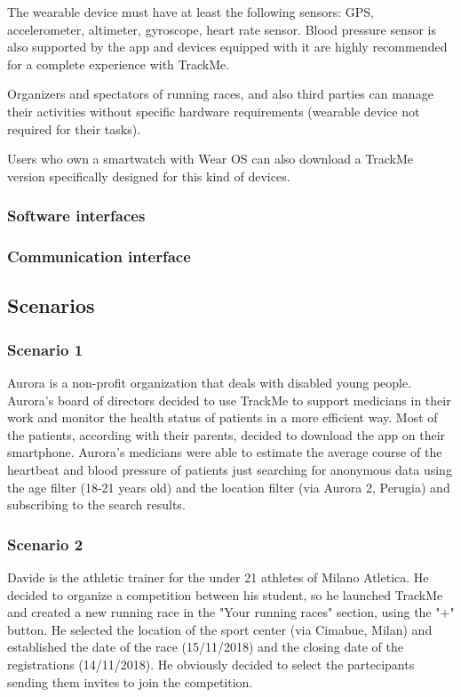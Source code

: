 The wearable device must have at least the following sensors: GPS, accelerometer, altimeter, gyroscope, heart rate sensor. Blood pressure sensor is also supported by the app and devices equipped with it are highly recommended for a complete experience with TrackMe.

Organizers and spectators of running races, and also third parties can manage their activities without specific hardware requirements (wearable device not required for their tasks).

Users who own a smartwatch with Wear OS can also download a TrackMe version specifically designed for this kind of devices.

\subsubsection{Software interfaces}
\subsubsection{Communication interface}

\subsection{Scenarios}
\subsubsection{Scenario 1}
Aurora is a non-profit organization that deals with disabled young people. Aurora's board of directors decided to use TrackMe to support medicians in their work and monitor the health status of patients in a more efficient way. Most of the patients, according with their parents, decided to download the app on their smartphone. Aurora's medicians were able to estimate the average course of the heartbeat and blood pressure of patients just searching for anonymous data using the age filter (18-21 years old) and the location filter (via Aurora 2, Perugia) and subscribing to the search results.

\subsubsection{Scenario 2}
Davide is the athletic trainer for the under 21 athletes of Milano Atletica. He decided to organize a competition between his student, so he launched TrackMe and created a new running race in the "Your running races" section, using the "+" button. He selected the location of the sport center (via Cimabue, Milan) and established the date of the race (15/11/2018) and the closing date of the registrations (14/11/2018). He obviously decided to select the partecipants sending them invites to join the competition.

